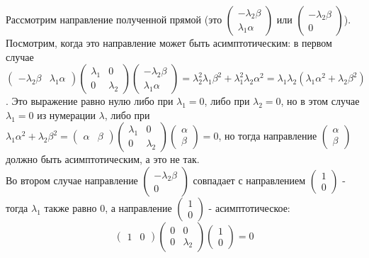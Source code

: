 \documentclass[a4paper, 12pt]{article}
\theoremstyle{definition}
\begin{document}
	Рассмотрим направление полученной прямой (это $\begin{pmatrix} -\lambda_2\beta \\ \lambda_1\alpha \end{pmatrix}$ или $\begin{pmatrix} -\lambda_2\beta \\ 0 \end{pmatrix}$). Посмотрим, когда это направление может быть асимптотическим: в первом случае $\begin{pmatrix} -\lambda_2\beta & \lambda_1\alpha \end{pmatrix}\begin{pmatrix}\lambda_1&0\\0&\lambda_2\end{pmatrix}\begin{pmatrix} -\lambda_2\beta \\ \lambda_1\alpha \end{pmatrix} = \lambda_2^2\lambda_1\beta^2 + \lambda_1^2\lambda_2\alpha^2 = \lambda_1\lambda_2(\lambda_1\alpha^2+\lambda_2\beta^2)$. Это выражение равно нулю либо при $\lambda_1 = 0$, либо при $\lambda_2 = 0$, но в этом случае $\lambda_1 = 0$ из нумерации $\lambda$, либо при $\lambda_1\alpha^2+\lambda_2\beta^2 = \begin{pmatrix} \alpha & \beta \end{pmatrix}\begin{pmatrix}\lambda_1&0\\0&\lambda_2\end{pmatrix}\begin{pmatrix} \alpha \\ \beta \end{pmatrix} =  0$, но тогда направление $\begin{pmatrix} \alpha \\ \beta \end{pmatrix}$ должно быть асимптотическим, а это не так.\\
	Во втором случае направление $\begin{pmatrix} -\lambda_2\beta \\ 0 \end{pmatrix}$ совпадает с направлением $\begin{pmatrix} 1 \\ 0 \end{pmatrix}$ - тогда $\lambda_1$ также равно 0, а направление $\begin{pmatrix} 1 \\ 0 \end{pmatrix}$ - асимптотическое: $$\begin{pmatrix} 1 & 0 \end{pmatrix}\begin{pmatrix}0&0\\0&\lambda_2\end{pmatrix}\begin{pmatrix} 1 \\ 0 \end{pmatrix} = 0$$
\end{document}
